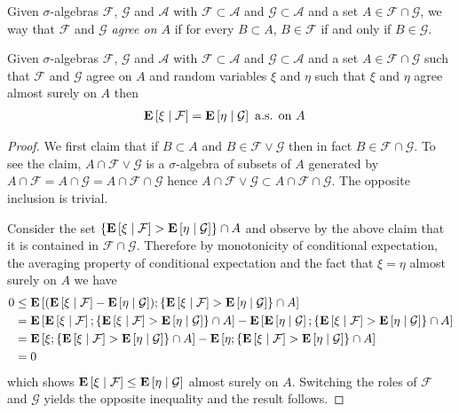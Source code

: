 \begin{defn}Given $\sigma$-algebras $\mathcal{F}$, $\mathcal{G}$ and
  $\mathcal{A}$ with $\mathcal{F} \subset \mathcal{A}$ and
  $\mathcal{G} \subset \mathcal{A}$ and a set $A \in \mathcal{F} \cap
  \mathcal{G}$, we way that $\mathcal{F}$ and $\mathcal{G}$
  \emph{agree on $A$} if for every $B \subset A$, $B \in \mathcal{F}$
  if and only if $B \in \mathcal{G}$.
\end{defn}
\begin{lem}\label{ConditionalExpectationIsLocal}Given $\sigma$-algebras $\mathcal{F}$, $\mathcal{G}$ and
  $\mathcal{A}$ with $\mathcal{F} \subset \mathcal{A}$ and
  $\mathcal{G} \subset \mathcal{A}$ and a set $A \in \mathcal{F} \cap
  \mathcal{G}$ such that $\mathcal{F}$ and $\mathcal{G}$ agree on $A$
  and random variables $\xi$ and $\eta$ such that $\xi$ and $\eta$
  agree almost surely on $A$ then
\begin{align*}
\textbf{E}\left[ \xi \mid \mathcal{F} \right] &=
\textbf{E}\left[ \eta \mid \mathcal{G} \right] \text{ a.s. on $A$}
\end{align*}
\end{lem}
\begin{proof}
We first claim that if $B \subset A$ and $B \in \mathcal{F} \vee
\mathcal{G}$ then in fact $B \in \mathcal{F} \cap
\mathcal{G}$.  To see the claim, $A \cap \mathcal{F} \vee
\mathcal{G}$ is a $\sigma$-algebra of subsets of $A$ generated by $A
\cap \mathcal{F} = A \cap \mathcal{G} = A \cap \mathcal{F} \cap
\mathcal{G}$ hence $A \cap \mathcal{F} \vee
\mathcal{G} \subset A \cap \mathcal{F} \cap
\mathcal{G}$.  The opposite inclusion is trivial.

Consider the set $\lbrace
\textbf{E}\left[ \xi \mid \mathcal{F} \right] >
\textbf{E}\left[ \eta \mid \mathcal{G} \right] \rbrace \cap A$ and observe by
the above claim that it
is contained in $\mathcal{F} \cap \mathcal{G}$.  Therefore by
monotonicity of conditional expectation, the averaging property of
conditional expectation and the fact that $\xi = \eta$ almost surely
on $A$ we have
\begin{align*}
0 &\leq \textbf{E}\left[(\textbf{E}\left[ \xi \mid \mathcal{F} \right] -
\textbf{E}\left[ \eta \mid \mathcal{G} \right] ) ; 
\lbrace
\textbf{E}\left[ \xi \mid \mathcal{F} \right] >
\textbf{E}\left[ \eta \mid \mathcal{G} \right] \rbrace \cap A\right] \\
&=\textbf{E}\left[\textbf{E}\left[ \xi \mid \mathcal{F} \right] ; 
\lbrace \textbf{E}\left[ \xi \mid \mathcal{F} \right] >
\textbf{E}\left[ \eta \mid \mathcal{G} \right] \rbrace \cap A\right] -
\textbf{E}\left[\textbf{E}\left[ \eta \mid \mathcal{G} \right] ; 
\lbrace
\textbf{E}\left[ \xi \mid \mathcal{F} \right] >
\textbf{E}\left[ \eta \mid \mathcal{G} \right] \rbrace \cap A\right] \\
&=\textbf{E}\left[\xi; 
\lbrace \textbf{E}\left[ \xi \mid \mathcal{F} \right] >
\textbf{E}\left[ \eta \mid \mathcal{G} \right] \rbrace \cap A\right] -
\textbf{E}\left[\eta ; 
\lbrace
\textbf{E}\left[ \xi \mid \mathcal{F} \right] >
\textbf{E}\left[ \eta \mid \mathcal{G} \right] \rbrace \cap A\right] \\
&=0
\end{align*}
which shows $\textbf{E}\left[ \xi \mid \mathcal{F} \right] \leq
\textbf{E}\left[ \eta \mid \mathcal{G} \right]$ almost surely on $A$.  Switching
the roles of $\mathcal{F}$ and $\mathcal{G}$ yields the opposite
inequality and the result follows.
\end{proof}

